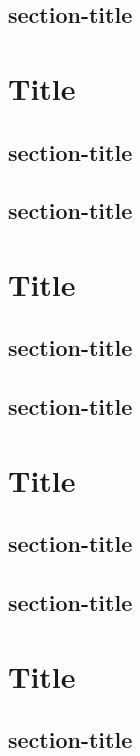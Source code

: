 \documentclass[12pt,twoside]{report}
\begin{document}
\section{section-title}
\blindtext[3]

\chapter{Title}

\blindtext[2]
\section{section-title}
\blindtext[3]
\section{section-title}
\blindtext[3]

\chapter{Title}

\blindtext[2]
\section{section-title}
\blindtext[3]
\section{section-title}
\blindtext[3]

\chapter{Title}

\blindtext[2]
\section{section-title}
\blindtext[3]
\section{section-title}
\blindtext[3]

\chapter{Title}

\blindtext[2]
\section{section-title}
\blindtext[3]
\end{document}
